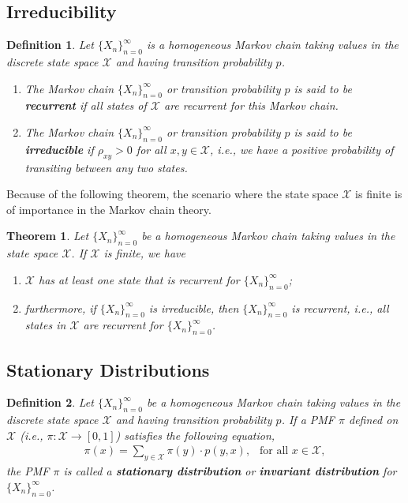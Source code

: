 \documentclass[11pt,letterpaper, leqno]{article}
\newtheorem{theorem}{Theorem}
\newtheorem{definition}{Definition}
\numberwithin{equation}{section}
\numberwithin{theorem}{section}
\numberwithin{lemma}{section}
\numberwithin{corollary}{section}
\numberwithin{definition}{section}
\numberwithin{proposition}{section}
\numberwithin{remark}{section}
\numberwithin{example}{section}
\begin{document}

\subsection{Irreducibility}

\begin{definition}
Let $\{X_n\}_{n=0}^\infty$ is a homogeneous Markov chain taking values in the discrete state space $\mathcal{X}$ and having transition probability $p$.
\begin{enumerate}
    \item The Markov chain $\{X_n\}_{n=0}^\infty$ or transition probability $p$ is said to be \textbf{recurrent} if all states of $\mathcal{X}$ are recurrent for this Markov chain.
    \item The Markov chain $\{X_n\}_{n=0}^\infty$ or transition probability $p$ is said to be \textbf{irreducible} if $\rho_{xy}>0$ for all $x,y\in\mathcal{X}$, i.e., we have a positive probability of transiting between any two states.
\end{enumerate}
\end{definition}

Because of the following theorem, the scenario where the state space $\mathcal{X}$ is finite is of importance in the Markov chain theory.
\begin{theorem}\label{thm: a finite state chain must have a recurrent state}
Let $\{X_n\}_{n=0}^\infty$ be a homogeneous Markov chain taking values in the state space $\mathcal{X}$. If $\mathcal{X}$ is finite, we have
\begin{enumerate}
    \item $\mathcal{X}$ has at least one state that is recurrent for $\{X_n\}_{n=0}^\infty$;
    \item furthermore, if $\{X_n\}_{n=0}^\infty$ is irreducible, then $\{X_n\}_{n=0}^\infty$ is recurrent, i.e., all states in $\mathcal{X}$ are recurrent for $\{X_n\}_{n=0}^\infty$.
\end{enumerate}
\end{theorem}


\subsection{Stationary Distributions}

\begin{definition}
Let $\{X_n\}_{n=0}^\infty$ be a homogeneous Markov chain taking values in the discrete state space $\mathcal{X}$ and having transition probability $p$. If a PMF $\pi$ defined on $\mathcal{X}$ (i.e., $\pi: \mathcal{X}\rightarrow[0,1]$) satisfies the following equation,
\begin{align}\label{eq: def of stationary distribution}
    \pi(x)=\sum_{y\in\mathcal{X}}\pi(y)\cdot p(y,x),\ \ \mbox{ for all }x\in\mathcal{X},
\end{align}
the PMF $\pi$ is called a \textbf{stationary distribution} or \textbf{invariant distribution} for $\{X_n\}_{n=0}^\infty$.
\end{definition}
\end{document}
